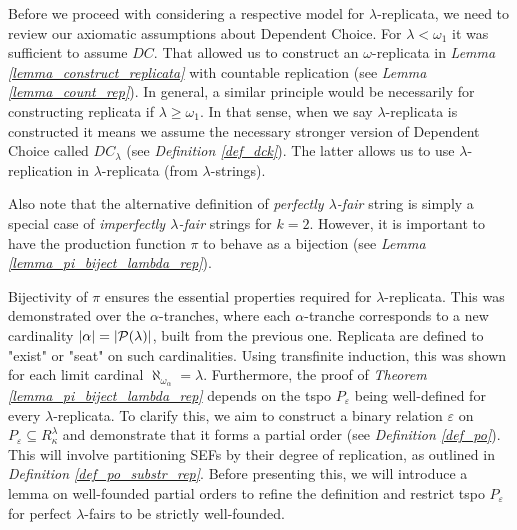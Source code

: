 Before we proceed with considering a respective model for $\lambda$-replicata, we need to review our axiomatic assumptions about Dependent Choice. For $\lambda < \omega_1$ it was sufficient to assume $DC$. That allowed us to construct an $\omega$-replicata in \textit{Lemma \ref{lemma_construct_replicata}} with countable replication (see \textit{Lemma \ref{lemma_count_rep}}). In general, a similar principle would be necessarily for constructing replicata if $\lambda \geq \omega_1$. In that sense, when we say $\lambda$-replicata is constructed it means we assume the necessary stronger version of Dependent Choice called $DC_\lambda$ (see \textit{Definition \ref{def_dck}}). The latter allows us to use $\lambda$-replication in $\lambda$-replicata (from $\lambda$-strings).

Also note that the alternative definition of \textit{perfectly $\lambda$-fair} string is simply a special case of \textit{imperfectly $\lambda$-fair} strings for $k=2$. However, it is important to have the production function $\pi$ to behave as a bijection (see \textit{Lemma \ref{lemma_pi_biject_lambda_rep}}).

Bijectivity of $\pi$ ensures the essential properties required for $\lambda$-replicata. This was demonstrated over the $\alpha$-tranches, where each $\alpha$-tranche corresponds to a new cardinality $|\alpha| = |\mathcal{P}(\lambda)|$, built from the previous one. Replicata are defined to "exist" or "seat" on such cardinalities. Using transfinite induction, this was shown for each limit cardinal $\aleph_{\omega_\alpha} = \lambda$. Furthermore, the proof of \textit{Theorem \ref{lemma_pi_biject_lambda_rep}} depends on the tspo $P_{\varepsilon}$ being well-defined for every $\lambda$-replicata. To clarify this, we aim to construct a binary relation $\varepsilon$ on $P_{\varepsilon} \subseteq R^\lambda_\kappa$ and demonstrate that it forms a partial order (see \textit{Definition \ref{def_po}}). This will involve partitioning SEFs by their degree of replication, as outlined in \textit{Definition \ref{def_po_substr_rep}}. Before presenting this, we will introduce a lemma on well-founded partial orders to refine the definition and restrict tspo $P_{\varepsilon}$ for perfect $\lambda$-fairs to be strictly well-founded.

